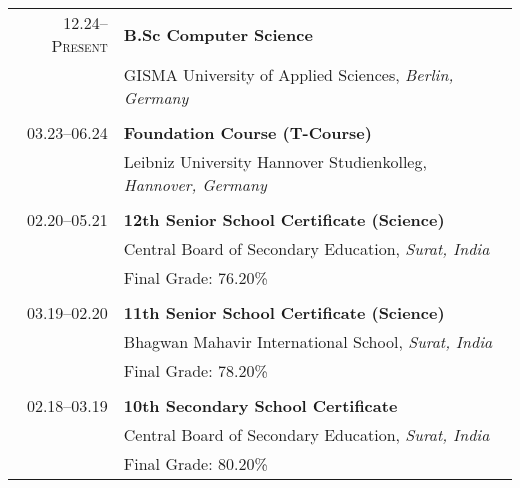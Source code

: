 \documentclass[12pt,a4paper]{moderncv}
\begin{document}
\begin{tabular}{r l}	
    \textsc{12.24}--\textsc{Present} \hspace{0.5em} 
        & \textbf{B.Sc Computer Science} \\
        & GISMA University of Applied Sciences, \textit{Berlin, Germany} \\
        & \\  %
        
    \textsc{03.23}--\textsc{06.24} \hspace{0.5em} 
        & \textbf{Foundation Course (T-Course)} \\
        & Leibniz University Hannover Studienkolleg, \textit{Hannover, Germany} \\
        & \\  %
        
    \textsc{02.20}--\textsc{05.21} \hspace{0.5em} 
        & \textbf{12th Senior School Certificate (Science)} \\
        & Central Board of Secondary Education, \textit{Surat, India} \\
        & Final Grade: 76.20\% \\
        & \\  %
        
    \textsc{03.19}--\textsc{02.20} \hspace{0.5em} 
        & \textbf{11th Senior School Certificate (Science)} \\
        & Bhagwan Mahavir International School, \textit{Surat, India} \\
        & Final Grade: 78.20\% \\
        & \\  %
        
    \textsc{02.18}--\textsc{03.19} \hspace{0.5em} 
        & \textbf{10th Secondary School Certificate} \\ 
        & Central Board of Secondary Education, \textit{Surat, India} \\
        & Final Grade: 80.20\% \\
\end{tabular}





\vspace{0.5cm}
\end{document}
